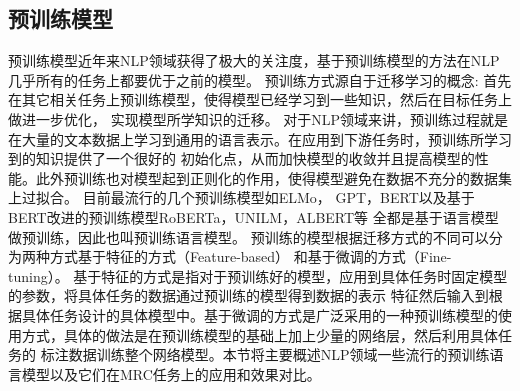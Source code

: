 \subsection{预训练模型}\label{pretrain}
预训练模型近年来NLP领域获得了极大的关注度，基于预训练模型的方法在NLP几乎所有的任务上都要优于之前的模型。
预训练方式源自于迁移学习的概念: 首先在其它相关任务上预训练模型，使得模型已经学习到一些知识，然后在目标任务上做进一步优化，
实现模型所学知识的迁移。
对于NLP领域来讲，预训练过程就是在大量的文本数据上学习到通用的语言表示。在应用到下游任务时，预训练所学习到的知识提供了一个很好的
初始化点，从而加快模型的收敛并且提高模型的性能。此外预训练也对模型起到正则化的作用，使得模型避免在数据不充分的数据集上过拟合。
目前最流行的几个预训练模型如ELMo，
GPT，BERT以及基于BERT改进的预训练模型RoBERTa，UNILM，ALBERT等
全都是基于语言模型做预训练，因此也叫预训练语言模型。
预训练的模型根据迁移方式的不同可以分为两种方式基于特征的方式（Feature-based）
和基于微调的方式（Fine-tuning）。
基于特征的方式是指对于预训练好的模型，应用到具体任务时固定模型的参数，将具体任务的数据通过预训练的模型得到数据的表示
特征然后输入到根据具体任务设计的具体模型中。基于微调的方式是广泛采用的一种预训练模型的使用方式，具体的做法是在预训练模型的基础上加上少量的网络层，然后利用具体任务的
标注数据训练整个网络模型。本节将主要概述NLP领域一些流行的预训练语言模型以及它们在MRC任务上的应用和效果对比。


